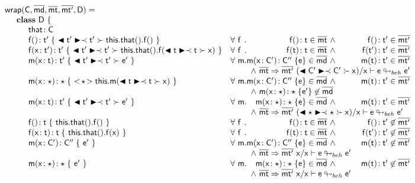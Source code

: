 \documentclass[a4paper,USenglish]{tex/lipics-v2016}
\begin{document}
\begin{figure}[!ht]
\hrulefill 
\footnotesize
\newcommand{\bscast}[2]{\EM{\BehCast{#1}{\ShaCast{#1}{#2}}}}
\vspace{4mm}
\[\begin{array}{@{}ll@{}l@{}r@{~}c@{~}r}
    \wrap\C{\b\md}\bmt\bmtp\D = \\
\SP \class ~\D ~ \{\\
\SPP \Fdef\that\C \\
\SPP \Mdefz\f{\tp}{~\bscast\tp{\Get{\Get\this\that}\f}~}
&    \All \f \Mtype\f{}\t\in\bmt &\wedge& \Mtype\f{}\tp \in \bmtp
\\
\SPP \Mdef\f\x\tp\tp {~\bscast\tp{\Set{\Get\this\that}\f{\bscast\t\x}}~}
&    \All \f \Mtype\f\t\t \in \bmt &\wedge& \Mtype\f\tp\tp \in \bmtp
\\
\SPP \Mdef\m\x\t\tp {~\bscast\tp{{\ep}}~}
&     \All \m \Mdef\m\x\Cp\Cpp\e\in\b\md &\wedge& \Mtype\m\t\tp\in\bmtp \\
&&&\multicolumn{3}{l}{\wedge~\rtranst{\bmt}\bmtp{(\bscast\Cp\x)}\x{\e}{\ep}}
\\
\SPP \Mdef\m\x\any\any {~\SubCast\any{\Call\this\m{\bscast{\t}\x}}~}
&     \All \m \Mdef\m\x\Cp\Cpp\e\in\b\md &\wedge& \Mtype\m\t\tp\in\bmtp\\
&&&\multicolumn{3}{l}{\wedge~\Mdef\m\x\any\any{\e'}\not\in\b\md}
\\
\SPP \Mdef\m\x\t\tp{~\bscast\tp{\ep}~}
&    \All \m \Mdef\m\x\any\any\e\in\b\md &\wedge& \Mtype\m\t\tp\in\bmtp \\
&&&\multicolumn{3}{l}{\wedge~\rtranst{\bmt}\bmtp{(\bscast\any\x)}\x\e{\ep}}
\\
\SPP \Mdefz\f\t { ~\Get{\Get\this\that}\f~}
&    \All \f \Mtype\f{}\t \in \bmt &\wedge& \Mtype\f{}\tp \not\in \bmtp
\\
\SPP \Mdef\f\x\t\t { ~\Set{\Get\this\that}\f\x~}
&    \All \f \Mtype\f\t\t \in \bmt&\wedge& \Mtype\f\tp\tp \not\in \bmtp
\\
\SPP \Mdef\m\x{\Cp}{\Cpp} {~\ep~}
&    \All \m  \Mdef\m\x\Cp\Cpp\e\in\b\md &\wedge& \Mtype\m\t\tp\not\in \bmtp \\
&&&\multicolumn{3}{l}{\wedge~\rtranst{\bmt}\bmtp\x\x{\e}{\ep}}
\\
\SPP \Mdef\m\x\any\any {~\ep~}
&    \All \m  \Mdef\m\x\any\any\e\in\b\md  &\wedge& \Mtype\m\t\tp\not\in\bmtp \\
&&&\multicolumn{3}{l}{\wedge~\rtranst{\bmt}\bmtp\x\x{\e}{\ep}}
\\

\end{array}\]
\end{figure}
\end{document}
